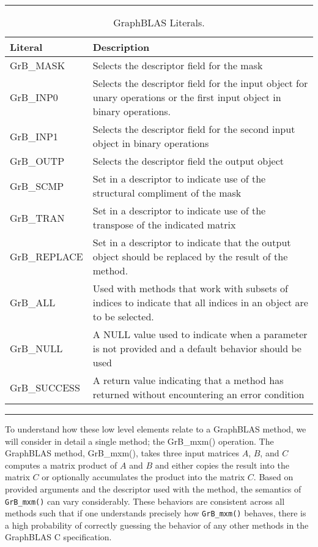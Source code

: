 \begin{table}[h]
\hrule
\begin{center}
\caption{GraphBLAS Literals.}
\label{Tab:GrBliterals}
\begin{tabular}{lp{5.25cm}}
Literal                 & Description  \\
\hline
GrB\_MASK         & Selects the descriptor field for the mask \\
GrB\_INP0           & Selects the descriptor field for the input object for unary operations or the first input object in binary operations. \\
GrB\_INP1           & Selects the descriptor field for the second input object in binary operations \\
GrB\_OUTP         & Selects the descriptor field the output object \\
GrB\_SCMP         &  Set in a descriptor to indicate use of the structural compliment of the mask \\
GrB\_TRAN          & Set in a descriptor to indicate use of the transpose of the indicated matrix \\
GrB\_REPLACE   &  Set in a descriptor to indicate that the output object should be replaced by the result of the method. \\
GrB\_ALL              & Used with methods that work with subsets of indices to indicate that all indices in an object are to be selected. \\
GrB\_NULL            & A NULL value used to indicate when a parameter is not provided and a default behavior should be used \\
GrB\_SUCCESS    & A return value indicating that a method has returned without encountering an error condition \\
\end{tabular}
\end{center}
\hrule
\end{table}

To understand how these low level elements relate to a GraphBLAS method, we
will consider in detail a single method; the {\sf GrB\_mxm()} operation.
The GraphBLAS method, {\sf GrB\_mxm()}, takes three input matrices $A$, $B$, and $C$
computes a matrix product of $A$ and $B$ and either copies the result into the matrix $C$
or optionally accumulates the product into the matrix $C$.  Based on provided arguments 
and the descriptor used with the method, the semantics of {\tt GrB\_mxm()} can vary considerably.
These behaviors are consistent across all methods such that if one understands precisely how
{\tt GrB\_mxm()} behaves, there is a high probability of correctly guessing the behavior of any other
methods in the GraphBLAS C specification.

